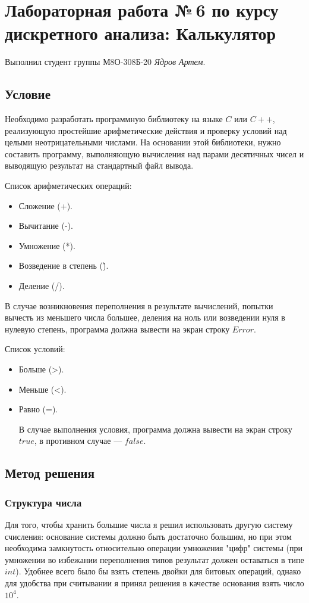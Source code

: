 \documentclass[12pt]{article}
\begin{document}
	
	\section*{Лабораторная работа №\,6 по курсу дискретного анализа: Калькулятор}
	
	Выполнил студент группы М8О-308Б-20 \textit{Ядров Артем}.
	
	\subsection*{Условие}
	Необходимо разработать программную библиотеку на языке $C$ или
	$C++$, реализующую простейшие арифметические действия и проверку
	условий над целыми неотрицательными числами. На основании этой
	библиотеки, нужно составить программу, выполняющую вычисления
	над парами десятичных чисел и выводящую результат на стандартный
	файл вывода.
	
	Список арифметических операций:
	\begin{itemize}
		\item Сложение (+).
		\item Вычитание (-).
		\item Умножение (*).
		\item Возведение в степень (\^).
		\item Деление (/).
	\end{itemize}
	
	В случае возникновения переполнения в результате вычислений,
	попытки вычесть из меньшего числа большее, деления на ноль или
	возведении нуля в нулевую степень, программа должна вывести на
	экран строку $Error$.
	
	Список условий:
	\begin{itemize}
		\item Больше (>).
		\item Меньше (<).
		\item Равно (=).
		
		В случае выполнения условия, программа должна вывести на экран
		строку $true$, в противном случае — $false$.
	\end{itemize}
	\subsection*{Метод решения}
	\subsubsection*{Структура числа}
	Для того, чтобы хранить большие числа я решил использовать другую систему счисления: основание системы должно быть достаточно большим, но при этом необходима замкнутость относительно операции умножения "цифр" системы (при умножении во избежании переполнения типов результат должен оставаться в типе $int$). Удобнее всего было бы взять степень двойки для битовых операций, однако для удобства при считывании я принял решения в качестве основания взять число $10^4$.
	
\end{document}
